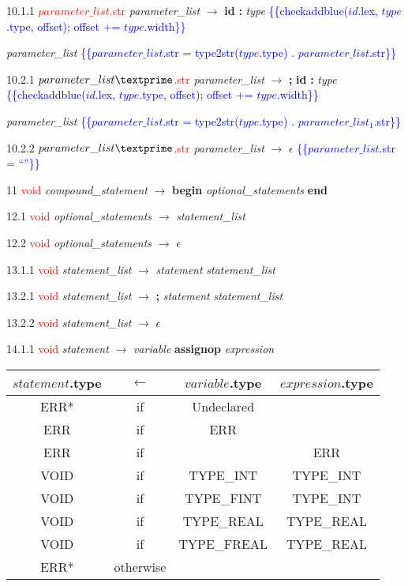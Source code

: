 10.1.1 \textcolor{red}{$parameter\_list$.str} \emph{parameter\_list} $\rightarrow$ \textbf{id} \textbf{:} \emph{type} \textcolor{blue}{\{\{checkaddblue($id$.lex, $type$.type, offset); offset += $type$.width\}\}}

\emph{parameter\_list\textprime} \textcolor{blue}{\{\{$parameter\_list$.str = type2str($type$.type) . $parameter\_list$\textprime.str\}\}}

10.2.1 \textcolor{red}{$parameter\_list\textprime$.str} \emph{parameter\_list\textprime} $\rightarrow$ \textbf{;} \textbf{id} \textbf{:} \emph{type} \textcolor{blue}{\{\{checkaddblue($id$.lex, $type$.type, offset); offset += $type$.width\}\}}

\emph{parameter\_list\textprime} \textcolor{blue}{\{\{$parameter\_list$\textprime.str = type2str($type$.type) . $parameter\_list_1$\textprime.str\}\}}


10.2.2 \textcolor{red}{$parameter\_list\textprime$.str} \emph{parameter\_list\textprime} $\rightarrow$ $\epsilon$ \textcolor{blue}{\{\{$parameter\_list$\textprime.str = ``''\}\}}

11   \textcolor{red}{void} \emph{compound\_statement} $\rightarrow$ \textbf{begin} \emph{optional\_statements} \textbf{end}

12.1 \textcolor{red}{void} \emph{optional\_statements} $\rightarrow$ \emph{statement\_list}

12.2 \textcolor{red}{void} \emph{optional\_statements} $\rightarrow$ $\epsilon$

13.1.1 \textcolor{red}{void} \emph{statement\_list} $\rightarrow$ \emph{statement} \emph{statement\_list\textprime}

13.2.1 \textcolor{red}{void} \emph{statement\_list\textprime} $\rightarrow$ \textbf{;} \emph{statement} \emph{statement\_list\textprime}

13.2.2 \textcolor{red}{void} \emph{statement\_list\textprime} $\rightarrow$ $\epsilon$

14.1.1 \textcolor{red}{void} \emph{statement} $\rightarrow$ \emph{variable} \textbf{assignop} \emph{expression}

\begin{tabular}[t]{|c|c|c|c|}
  \hline

  $statement$.type & \textbf{$\leftarrow$} & $variable$.type & $expression$.type \\

  \hline

  ERR* & if & Undeclared &  \\
  ERR & if & ERR & \\
  ERR & if & & ERR \\
  VOID & if & TYPE_INT & TYPE_INT \\
  VOID & if & TYPE_FINT & TYPE_INT \\
  VOID & if & TYPE_REAL & TYPE_REAL \\
  VOID & if & TYPE_FREAL & TYPE_REAL \\
  ERR* & otherwise &  &  \\
  \hline

\end{tabular}

